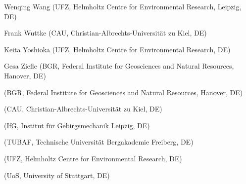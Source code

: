 \begin{list}{-}{\leftmargin=1em \itemindent=0em \itemsep=0.1em}
\item Wenqing Wang (UFZ, Helmholtz Centre for Environmental Research, Leipzig, DE) 
\item Frank Wuttke (CAU, Christian-Albrechts-Universität zu Kiel, DE)	
\item Keita Yoshioka (UFZ, Helmholtz Centre for Environmental Research, DE) 
\item Gesa Ziefle (BGR, Federal Institute for Geosciences and Natural Resources, Hanover, DE)	
\item [] (BGR, Federal Institute for Geosciences and Natural Resources, Hanover, DE)	
\item [] (CAU, Christian-Albrechts-Universität zu Kiel, DE)	
\item [] (IfG, Institut für Gebirgsmechanik Leipzig, DE)	
\item [] (TUBAF, Technische Universit\"at Bergakademie Freiberg, DE)	
\item [] (UFZ, Helmholtz Centre for Environmental Research, DE)	
\item [] (UoS, University of Stuttgart, DE)	
\end{list}